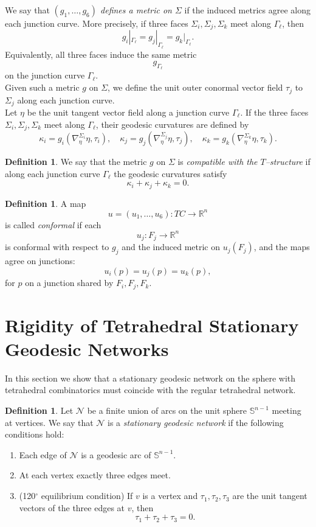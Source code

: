 \documentclass[11pt]{amsart}
\numberwithin{equation}{section}
\theoremstyle{theorem}
\theoremstyle{definition}
\newtheorem{definition}[theorem]{Definition}
\numberwithin{equation}{section}
\begin{document}
We say that \emph{$(g_1,\ldots,g_6)$ defines a metric on $\Sigma$}
if the induced metrics agree along each junction curve.
More precisely, if three faces $\Sigma_{i},\Sigma_{j},\Sigma_{k}$
meet along $\Gamma_\ell$, then
\[
g_i|_{\Gamma_\ell} = g_j|_{\Gamma_\ell} = g_k|_{\Gamma_\ell}.
\]
Equivalently, all three faces induce the same metric
\[
g_{\Gamma_\ell}
\]
on the junction curve $\Gamma_\ell$.\\
Given such a metric $g$ on $\Sigma$, we define the unit outer conormal
vector field $\tau_j$ to $\Sigma_j$ along each junction curve.\\
Let $\eta$ be the unit tangent vector field along a junction curve
$\Gamma_\ell$.
If the three faces $\Sigma_i,\Sigma_j,\Sigma_k$ meet along $\Gamma_\ell$,
their geodesic curvatures are defined by
\[
\kappa_i = g_i(\nabla_{\eta}^{\Sigma_i} \eta ,\tau_i), \quad
\kappa_j = g_j(\nabla_{\eta}^{\Sigma_j} \eta ,\tau_j), \quad
\kappa_k = g_k(\nabla_{\eta}^{\Sigma_k} \eta ,\tau_k).
\]

\begin{definition}
We say that the metric $g$ on $\Sigma$ is \emph{compatible with the
$T$–structure} if along each junction curve $\Gamma_\ell$ the geodesic
curvatures satisfy
\[
\kappa_i + \kappa_j + \kappa_k = 0 .
\]
\end{definition}

\begin{definition}
A map
\[
u=(u_1,\ldots,u_6):TC \to \mathbb{R}^n
\]
is called \emph{conformal} if each
\[
u_j : F_j \to \mathbb{R}^n
\]
is conformal with respect to $g_j$ and the induced metric on $u_j(F_j)$, and the maps agree on junctions: 
\[
u_i(p)=u_j(p)=u_k(p),
\]
for $p$ on a junction shared by $F_i,F_j,F_k$.
\end{definition}


\section{Rigidity of Tetrahedral Stationary Geodesic Networks}
\label{sec:uniq-tsg-net}

In this section we show that a stationary geodesic network on the sphere with
tetrahedral combinatorics must coincide with the regular tetrahedral
network.

\begin{definition}
Let $\mathcal{N}$ be a finite union of arcs on the unit sphere
$\mathbb S^{n-1}$ meeting at vertices.
We say that $\mathcal{N}$ is a \emph{stationary geodesic network}
if the following conditions hold:

\begin{enumerate}
\item Each edge of $\mathcal{N}$ is a geodesic arc of $\mathbb S^{n-1}$.

\item At each vertex exactly three edges meet.

\item (120$^\circ$ equilibrium condition)
If $v$ is a vertex and $\tau_1,\tau_2,\tau_3$ are the unit tangent
vectors of the three edges at $v$, then
\[
\tau_1+\tau_2+\tau_3=0 .
\]
\end{enumerate}
\end{definition}
\end{document}
